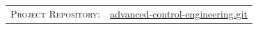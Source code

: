 \documentclass[12pt,a4paper,oneside]{book}
\newcommand{\MetaLabelA}{Project Repository}
\newcommand{\MetaValueAUrl}{https://github.com/pwr-control/advanced-control-engineering.git}
\newcommand{\MetaValueALabel}{advanced-control-engineering.git}
\newcommand{\MetaLabelB}{Framework}
\newcommand{\MetaValueB}{MATLAB/Simulink/Simscape}
\newcommand{\MetaLabelC}{Architecture}
\newcommand{\MetaValueC}{SiC, EiceDRIVER, Customized Power Supplies}
\begin{document}
	\vfill
	
	\noindent
	\begin{tabular}{@{} r @{\quad} l @{}}
		\textsc{\MetaLabelA:} & {\href{\MetaValueAUrl}{\MetaValueALabel}} \\[3pt]
	\end{tabular}
	
	\newpage
	\setcounter{page}{1}
	\tableofcontents
	\listoffigures	
	\listoftables
	\newpage
	
\end{document}
